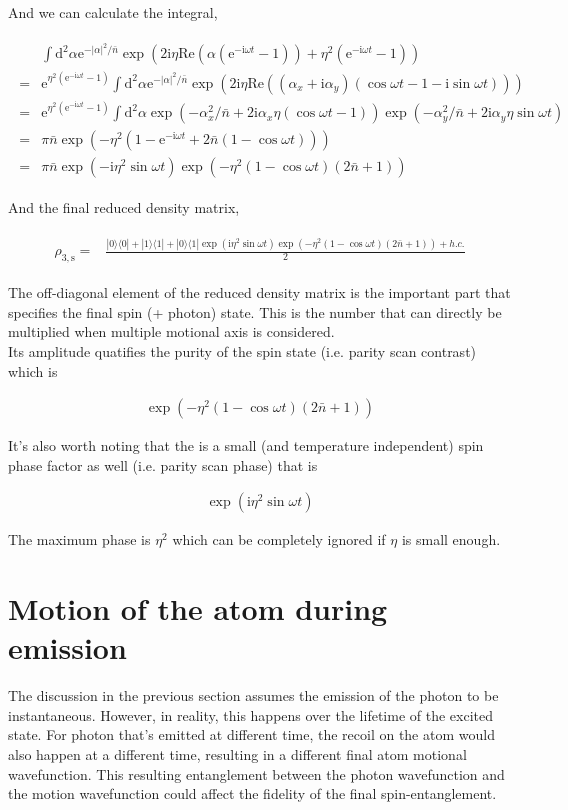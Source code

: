 \documentclass[10pt,fleqn]{article}
\newcommand{\ud}{\mathrm{d}}
\newcommand{\ue}{\mathrm{e}}
\newcommand{\ui}{\mathrm{i}}
\newcommand{\eqar}[1]
{
  \begin{align}
    #1
  \end{align}
}
\newcommand{\paren}[1]{{\left({#1}\right)}}
\newcommand{\abs}[1]{{\left|{#1}\right|}}
\begin{document}
And we can calculate the integral,
\eqar{
  \begin{split}
    &\int\ud^2\alpha \ue^{-\abs{\alpha}^2/{\bar n}}\exp\paren{
      2\ui\eta\mathrm{Re}\paren{\alpha\paren{\ue^{-\ui\omega t}-1}}
      +\eta^2\paren{\ue^{-\ui\omega t}-1}
      }\\
    =&\ue^{\eta^2\paren{\ue^{-\ui\omega t}-1}}
       \int\ud^2\alpha \ue^{-\abs{\alpha}^2/{\bar n}}\exp\paren{
       2\ui\eta\mathrm{Re}\paren{\paren{\alpha_x+\ui\alpha_y}\paren{\cos\omega t-1-\ui\sin\omega t}}}\\
    =&\ue^{\eta^2\paren{\ue^{-\ui\omega t}-1}}
       \int\ud^2\alpha
       \exp\paren{
       -\alpha_x^2/{\bar n}
       +2\ui\alpha_x\eta\paren{\cos\omega t-1}
       }
       \exp\paren{
       -\alpha_y^2/{\bar n}
       +2\ui\alpha_y\eta\sin\omega t
       }\\
    =&\pi {\bar n}\exp\paren{-\eta^2\paren{1-\ue^{-\ui\omega t}+2{\bar n}\paren{1-\cos\omega t}}}\\
    =&\pi {\bar n}\exp\paren{-\ui\eta^2\sin\omega t}\exp\paren{-\eta^2\paren{1-\cos\omega t}\paren{2{\bar n}+1}}
  \end{split}
}
And the final reduced density matrix,
\eqar{
  \begin{split}
    \rho_{3,\mathrm{s}}=&\frac{|0\rangle\langle0|+|1\rangle\langle1|+|0\rangle\langle1|\exp\paren{\ui\eta^2\sin\omega t}\exp\paren{-\eta^2\paren{1-\cos\omega t}\paren{2{\bar n}+1}}+h.c.}{2}
  \end{split}
}
The off-diagonal element of the reduced density matrix is the important part
that specifies the final spin (+ photon) state. This is the number that can
directly be multiplied when multiple motional axis is considered.\\

Its amplitude quatifies the purity of the spin state (i.e. parity scan contrast) which is
\eqar{
  \exp\paren{-\eta^2\paren{1-\cos\omega t}\paren{2{\bar n}+1}}
}

It's also worth noting that the is a small (and temperature independent)
spin phase factor as well (i.e. parity scan phase) that is
\eqar{
  \exp\paren{\ui\eta^2\sin\omega t}
}
The maximum phase is $\eta^2$ which can be completely ignored if $\eta$ is small enough.

\section{Motion of the atom during emission}

The discussion in the previous section assumes the emission of the photon to be
instantaneous. However, in reality, this happens over the lifetime of the excited state.
For photon that's emitted at different time, the recoil on the atom would also happen
at a different time, resulting in a different final atom motional wavefunction.
This resulting entanglement between the photon wavefunction and the motion wavefunction
could affect the fidelity of the final spin-entanglement.\\
\end{document}
